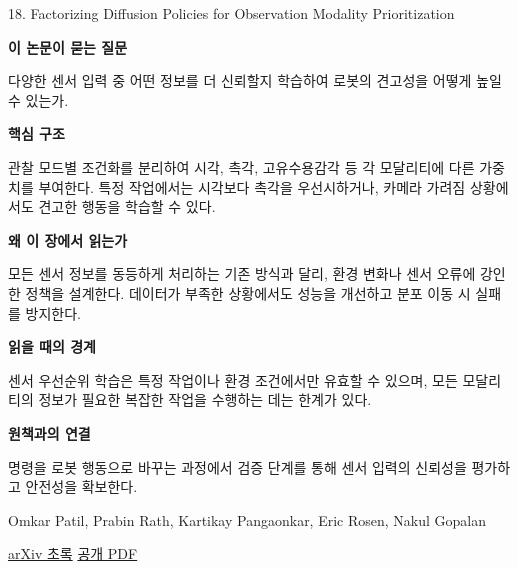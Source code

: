 \documentclass[11pt,openany]{book}
\begin{document}
\begin{termcard}{18. Factorizing Diffusion Policies for Observation Modality Prioritization}

\par

\medskip

{\sffamily\bfseries\color{deepblue} 이 논문이 묻는 질문}\par

다양한 센서 입력 중 어떤 정보를 더 신뢰할지 학습하여 로봇의 견고성을 어떻게 높일 수 있는가.

\smallskip

{\sffamily\bfseries\color{deepblue} 핵심 구조}\par

관찰 모드별 조건화를 분리하여 시각, 촉각, 고유수용감각 등 각 모달리티에 다른 가중치를 부여한다. 특정 작업에서는 시각보다 촉각을 우선시하거나, 카메라 가려짐 상황에서도 견고한 행동을 학습할 수 있다.

\smallskip

{\sffamily\bfseries\color{deepblue} 왜 이 장에서 읽는가}\par

모든 센서 정보를 동등하게 처리하는 기존 방식과 달리, 환경 변화나 센서 오류에 강인한 정책을 설계한다. 데이터가 부족한 상황에서도 성능을 개선하고 분포 이동 시 실패를 방지한다.

\smallskip

{\sffamily\bfseries\color{coral} 읽을 때의 경계}\par

센서 우선순위 학습은 특정 작업이나 환경 조건에서만 유효할 수 있으며, 모든 모달리티의 정보가 필요한 복잡한 작업을 수행하는 데는 한계가 있다.

\smallskip

{\sffamily\bfseries\color{teal} 원책과의 연결}\par

명령을 로봇 행동으로 바꾸는 과정에서 검증 단계를 통해 센서 입력의 신뢰성을 평가하고 안전성을 확보한다.

\medskip

{\footnotesize\color{muted} Omkar Patil, Prabin Rath, Kartikay Pangaonkar, Eric Rosen, Nakul Gopalan\par

\href{https://arxiv.org/abs/2509.16830}{arXiv 초록} \quad \href{https://arxiv.org/pdf/2509.16830}{공개 PDF}\par}

\end{termcard}
\end{document}
